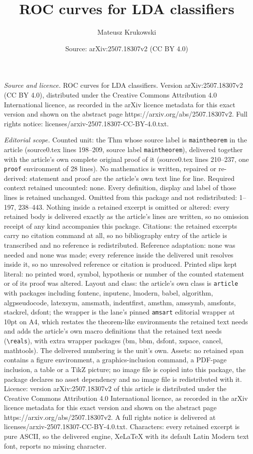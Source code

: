 \documentclass[10pt,a4paper]{amsart}
\title[ROC curves for LDA classifiers]{ROC curves for LDA classifiers}
\author{Mateusz Krukowski}
\date{Source: arXiv:2507.18307v2 (CC BY 4.0)}
\begin{document}
\maketitle

\noindent\emph{Source and licence.} ROC curves for LDA classifiers. Version arXiv:2507.18307v2 (CC BY 4.0), distributed under the Creative Commons Attribution 4.0 International licence, as recorded in the arXiv licence metadata for this exact version and shown on the abstract page https://arxiv.org/abs/2507.18307v2. Full rights notice: licenses/arxiv-2507.18307-CC-BY-4.0.txt.\par\smallskip

\noindent\textit{Editorial scope.} Counted unit: the Thm whose source label is \texttt{maintheorem} in the article (source0.tex lines 198--209, source label \texttt{maintheorem}), delivered together with the article's own complete original proof of it (source0.tex lines 210--237, one \texttt{proof} environment of 28 lines). No mathematics is written, repaired or re-derived: statement and proof are the article's own text line for line. Required context retained uncounted: none. Every definition, display and label of those lines is retained unchanged. Omitted from this package and not redistributed: 1--197, 238--443. Nothing inside a retained excerpt is omitted or altered: every retained body is delivered exactly as the article's lines are written, so no omission receipt of any kind accompanies this package. Citations: the retained excerpts carry no citation command at all, so no bibliography entry of the article is transcribed and no reference is redistributed. Reference adaptation: none was needed and none was made; every reference inside the delivered unit resolves inside it, so no unresolved reference or citation is produced. Printed slips kept literal: no printed word, symbol, hypothesis or number of the counted statement or of its proof was altered. Layout and class: the article's own class is \texttt{article} with packages including fontenc, inputenc, lmodern, babel, algorithm, algpseudocode, latexsym, amsmath, indentfirst, amsthm, amssymb, amsfonts, stackrel, dsfont; the wrapper is the lane's pinned \texttt{amsart} editorial wrapper at 10pt on A4, which restates the theorem-like environments the retained text needs and adds the article's own macro definitions that the retained text needs (\texttt{\textbackslash reals}), with extra wrapper packages (bm, bbm, dsfont, xspace, cancel, mathtools). The delivered numbering is the unit's own. Assets: no retained span contains a figure environment, a graphics-inclusion command, a PDF-page inclusion, a table or a TikZ picture; no image file is copied into this package, the package declares no asset dependency and no image file is redistributed with it. Licence: version arXiv:2507.18307v2 of this article is distributed under the Creative Commons Attribution 4.0 International licence, as recorded in the arXiv licence metadata for this exact version and shown on the abstract page https://arxiv.org/abs/2507.18307v2. A full rights notice is delivered at licenses/arxiv-2507.18307-CC-BY-4.0.txt. Characters: every retained excerpt is pure ASCII, so the delivered engine, XeLaTeX with its default Latin Modern text font, reports no missing character.
\end{document}

